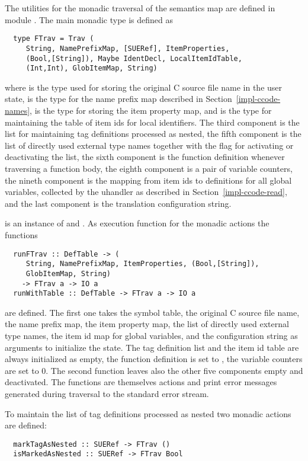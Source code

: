 The utilities for the monadic traversal of the semantics map are defined in module . 
The main monadic type is defined as
\begin{verbatim}
  type FTrav = Trav (
     String, NamePrefixMap, [SUERef], ItemProperties,
     (Bool,[String]), Maybe IdentDecl, LocalItemIdTable,
     (Int,Int), GlobItemMap, String)
\end{verbatim}
where  is the type used for storing the original C source file name in the user state,
 is the type for the name prefix map described in Section~\ref{impl-ccode-names},
 is the type for storing the item property map, and  is
the type for maintaining the table of item ids for local identifiers. The third component is the list for
maintaining tag definitions processed as nested, the fifth component is the list of directly used external type names 
together with the flag for activating or deactivating the list, the sixth component is the function definition
whenever traversing a function body, the eighth component is a pair of variable counters, the nineth component
is the mapping from item ids to definitions for all global variables, collected by the uhandler as described
in Section~\ref{impl-ccode-read}, and the last component is the translation configuration string.

 is an
instance of  and . As execution function for the monadic actions the functions
\begin{verbatim}
  runFTrav :: DefTable -> (
     String, NamePrefixMap, ItemProperties, (Bool,[String]),
     GlobItemMap, String)
    -> FTrav a -> IO a
  runWithTable :: DefTable -> FTrav a -> IO a
\end{verbatim}
are defined. The first one takes the symbol table, the original C source file name, the name prefix map, 
the item property map, the list of directly used external type names, the item id map for global variables, and the
configuration string as arguments to initialize the state. The tag definition list and the item id table
are always initialized as empty,
the function definition is set to , the variable counters are set to 0. The second
function leaves also the other five components empty and deactivated. The functions are themselves
 actions and print error messages generated during traversal to the standard error stream.

To maintain the list of tag definitions processed as nested two monadic actions are defined:
\begin{verbatim}
  markTagAsNested :: SUERef -> FTrav ()
  isMarkedAsNested :: SUERef -> FTrav Bool
\end{verbatim}

